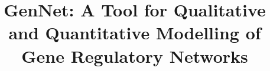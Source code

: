 \documentclass[twocolumn]{bmcart}%
\begin{document}
\begin{frontmatter}

\begin{fmbox}


\title{GenNet: A Tool for Qualitative and Quantitative Modelling of Gene Regulatory Networks}


\author[
   addressref={aff1},                   %
   corref={aff1},                       %
   noteref={n1},                        %
   email={leepianz@gmail.com}   %
]{ }



\address[id=aff1]{%
  , %
  ,                     %
  ,                              %
}
\address[id=aff2]{%
  ,
  ,
  ,
}


\end{fmbox}
\end{frontmatter}
\end{document}
